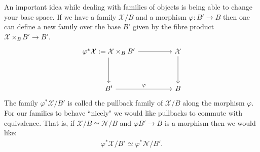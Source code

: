 An important idea while dealing with families of objects is being able to change your base space.
If we have a family $\mathcal{X}/B$ and a morphism $\varphi: B' \to B$ then one can define a new family over the base $B'$ given by the fibre product $\mathcal{X} \times_{B} B' \to B'$.
\[
\begin{tikzcd}
    {\varphi^{*}\mathcal{X} := \mathcal{X} \times_{B} B'} & & \mathcal{X}\\
    \\
    B' && B
    \arrow[ from = 1-3, to = 3-3]
    \arrow[from = 1-1, to = 1-3]
    \arrow["\varphi", from = 3-1, to = 3-3]
    \arrow[from = 1-1, to = 3-1]
\end{tikzcd}
\]
The family $\varphi^{*}\mathcal{X}/B'$ is called the pullback family of $\mathcal{X}/B$ along the morphism $\varphi$.
For our families to behave ``nicely" we would like pullbacks to commute with equivalence. 
That is, if $\mathcal{X}/B \simeq \mathcal{N}/B $ and $\varphi B' \to B$ is a morphism then we would like:
\begin{align*}
    \varphi^{*}\mathcal{X}/B' \simeq \varphi^{*}\mathcal{N}/B'.
\end{align*}

